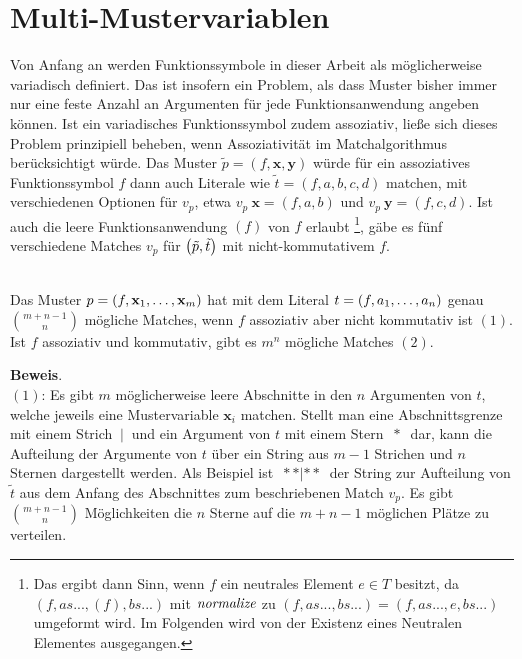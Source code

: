 \section{Multi-Mustervariablen} \label{subsecMulti}

Von Anfang an werden Funktionssymbole in dieser Arbeit als möglicherweise variadisch definiert. Das ist insofern ein Problem, als dass Muster bisher immer nur eine feste Anzahl an Argumenten für jede Funktionsanwendung angeben können. Ist ein variadisches Funktionssymbol zudem assoziativ, ließe sich dieses Problem prinzipiell beheben, wenn Assoziativität im Matchalgorithmus berücksichtigt würde. Das Muster $\tilde p = (f, \mathbf x, \mathbf y)$ würde für ein assoziatives Funktionssymbol $f$ dann auch Literale wie $\tilde t = (f, a, b, c, d)$ matchen, mit verschiedenen Optionen für $v_p$, etwa $v_p~\mathbf x = (f, a, b)$ und $v_p~\mathbf y = (f, c, d)$. Ist auch die leere Funktionsanwendung $(f)$ von $f$ erlaubt \footnote{Das ergibt dann Sinn, wenn $f$ ein neutrales Element $e \in T$ besitzt, da $(f, as..., (f), bs...)$ mit $\Const{normalize}$ zu $(f, as..., bs...) = (f, as..., e, bs...)$ umgeformt wird. Im Folgenden wird von der Existenz eines Neutralen Elementes ausgegangen.}, gäbe es fünf verschiedene Matches $v_p$ für $\paren*{\tilde p, \tilde t}$ mit nicht-kommutativem $f$.

\begin{lemma}~\\ \label{lemNrAssocMatches}
Das Muster $p = (f, \elems {\mathbf x} 1 m)$ hat mit dem Literal $t = (f, \elems a 1 n)$ genau ${m + n - 1}\choose n$ mögliche Matches, wenn $f$ assoziativ aber nicht kommutativ ist $(1)$. Ist $f$ assoziativ und kommutativ, gibt es $m^n$ mögliche Matches $(2)$.\\
\end{lemma}

\textbf{Beweis}.\\
$(1)$: Es gibt $m$ möglicherweise leere Abschnitte in den $n$ Argumenten von $t$, welche jeweils eine Mustervariable $\mathbf x_i$ matchen. Stellt man eine Abschnittsgrenze mit einem Strich $~|~$ und ein Argument von $t$ mit einem Stern $~*~$ dar, kann die Aufteilung der Argumente von $t$ über ein String aus $m - 1$ Strichen und $n$ Sternen dargestellt werden. 
Als Beispiel ist $~**|**~$ der String zur Aufteilung von $\tilde t$ aus dem Anfang des Abschnittes zum beschriebenen Match $v_p$.
Es gibt ${m + n - 1}\choose n$ Möglichkeiten die $n$ Sterne auf die ${m + n - 1}$ möglichen Plätze zu verteilen.\\

